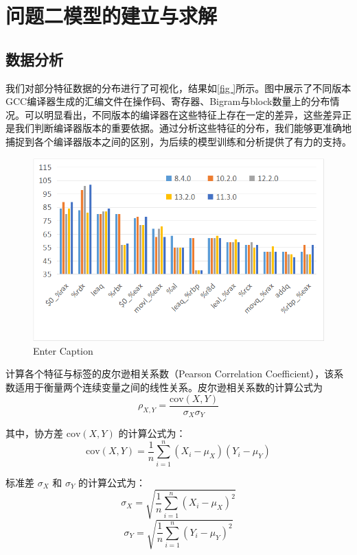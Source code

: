 \section{问题二模型的建立与求解}
  \subsection{数据分析}
  我们对部分特征数据的分布进行了可视化，结果如\autoref{fig
}所示。图中展示了不同版本GCC编译器生成的汇编文件在操作码、寄存器、Bigram与block数量上的分布情况。可以明显看出，不同版本的编译器在这些特征上存在一定的差异，这些差异正是我们判断编译器版本的重要依据。通过分析这些特征的分布，我们能够更准确地捕捉到各个编译器版本之间的区别，为后续的模型训练和分析提供了有力的支持。
  \begin{figure}[H]
      \centering
      \includegraphics[width=1\linewidth]{figures/hist.png}
      \caption{Enter Caption}
      \label{fig:hist}
  \end{figure}

  
计算各个特征与标签的皮尔逊相关系数（Pearson Correlation Coefficient），该系数适用于衡量两个连续变量之间的线性关系。皮尔逊相关系数的计算公式为
\begin{equation}
\rho_{X,Y} = \frac{\text{cov}(X, Y)}{\sigma_X \sigma_Y}
\label{eq:correlation}
\end{equation}

其中，协方差 \(\text{cov}(X, Y)\) 的计算公式为：
\begin{equation}
\text{cov}(X, Y) = \frac{1}{n} \sum_{i=1}^{n} (X_i - \mu_X)(Y_i - \mu_Y)
\label{eq:covariance}
\end{equation}

标准差 \(\sigma_X\) 和 \(\sigma_Y\) 的计算公式为：
\begin{equation}
\sigma_X = \sqrt{\frac{1}{n} \sum_{i=1}^{n} (X_i - \mu_X)^2}
\label{eq:stddev_x}
\end{equation}
\begin{equation}
\sigma_Y = \sqrt{\frac{1}{n} \sum_{i=1}^{n} (Y_i - \mu_Y)^2}
\label{eq:stddev_y}
\end{equation}


